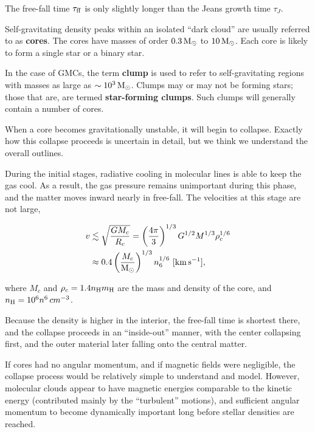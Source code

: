 \documentclass[a4paper,10pt]{article}
\begin{document}
{\noindent}The free-fall time $\tau_{\rm ff}$ is only slightly longer than the Jeans growth time $\tau_J$.

{\noindent}Self-gravitating density peaks within an isolated ``dark cloud'' are usually referred to as \textbf{cores}. The cores have masses of order $0.3\,{\rm M_\odot}$ to $10\,{\rm M_\odot}$. Each core is likely to form a single star or a binary star.

{\noindent}In the case of GMCs, the term \textbf{clump} is used to refer to self-gravitating regions with masses as large as $\sim10^3\,{\rm M_\odot}$. Clumps may or may not be forming stars; those that are, are termed \textbf{star-forming clumps}. Such clumps will generally contain a number of cores.

{\noindent}When a core becomes gravitationally unstable, it will begin to collapse. Exactly how this collapse proceeds is uncertain in detail, but we think we understand the overall outlines.

{\noindent}During the initial stages, radiative cooling in molecular lines is able to keep the gas cool. As a result, the gas pressure remains unimportant during this phase, and the matter moves inward nearly in free-fall. The velocities at this stage are not large,

\begin{align*}
    v &\lesssim \sqrt{\frac{GM_c}{R_c}} = \left(\frac{4\pi}{3}\right)^{1/3} G^{1/2} M^{1/3} \rho_c^{1/6} \\
    &\approx 0.4 \left(\frac{M_c}{{\rm M_\odot}}\right)^{1/3} n_6^{1/6} ~ [{\rm km\,s^{-1}}],
\end{align*}

{\noindent}where $M_c$ and $\rho_c=1.4n_{\rm H}m_{\rm H}$ are the mass and density of the core, and $n_{\rm H}=10^6n^6\,{cm^{-3}}$.

{\noindent}Because the density is higher in the interior, the free-fall time is shortest there, and the collapse proceeds in an ``inside-out'' manner, with the center collapsing first, and the outer material later falling onto the central matter.

{\noindent}If cores had no angular momentum, and if magnetic fields were negligible, the collapse process would be relatively simple to understand and model. However, molecular clouds appear to have magnetic energies comparable to the kinetic energy (contributed mainly by the ``turbulent'' motions), and sufficient angular momentum to become dynamically important long
before stellar densities are reached. 
\end{document}
